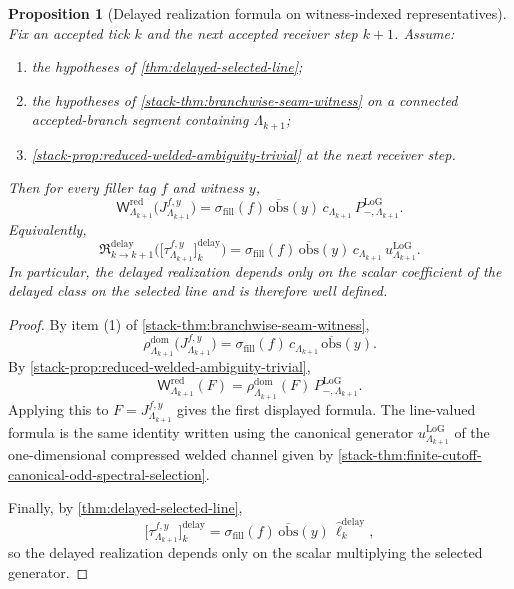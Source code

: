 \documentclass[11pt]{article}
\theoremstyle{definition}
\theoremstyle{plain}
\newtheorem{proposition}[definition]{Proposition}
\theoremstyle{remark}
\begin{document}
\begin{proposition}[Delayed realization formula on witness-indexed representatives]
\label{prop:delayed-realization-formula}
Fix an accepted tick \(k\) and the next accepted receiver step \(k+1\).
Assume:
\begin{enumerate}[leftmargin=2em,label=(\alph*)]
\item the hypotheses of \cref{thm:delayed-selected-line};
\item the hypotheses of \cref{stack-thm:branchwise-seam-witness} on a connected
  accepted-branch segment containing \(\Lambda_{k+1}\);
\item \cref{stack-prop:reduced-welded-ambiguity-trivial} at the next receiver step.
\end{enumerate}
Then for every filler tag \(f\) and witness \(y\),
\[
\mathsf W^{\mathrm{red}}_{\Lambda_{k+1}}\!\big(J^{f,y}_{\Lambda_{k+1}}\big)
=
\sigma_{\mathrm{fill}}(f)\,
\overline{\mathrm{obs}}(y)\,
c_{\Lambda_{k+1}}\,
P^{\mathrm{LoG}}_{-,\Lambda_{k+1}}.
\]
Equivalently,
\[
\mathfrak R^{\mathrm{delay}}_{k\to k+1}\!\big(
\big[\tau^{f,y}_{\Lambda_{k+1}}\big]^{\mathrm{delay}}_k
\big)
=
\sigma_{\mathrm{fill}}(f)\,
\overline{\mathrm{obs}}(y)\,
c_{\Lambda_{k+1}}\,
u^{\mathrm{LoG}}_{\Lambda_{k+1}}.
\]
In particular, the delayed realization depends only on the scalar coefficient of the delayed class
on the selected line and is therefore well defined.
\end{proposition}

\begin{proof}
By item \textnormal{(1)} of \cref{stack-thm:branchwise-seam-witness},
\[
\rho^{\mathrm{dom}}_{\Lambda_{k+1}}\!\big(J^{f,y}_{\Lambda_{k+1}}\big)
=
\sigma_{\mathrm{fill}}(f)\,
c_{\Lambda_{k+1}}\,
\overline{\mathrm{obs}}(y).
\]
By \cref{stack-prop:reduced-welded-ambiguity-trivial},
\[
\mathsf W^{\mathrm{red}}_{\Lambda_{k+1}}(F)
=
\rho^{\mathrm{dom}}_{\Lambda_{k+1}}(F)\,P^{\mathrm{LoG}}_{-,\Lambda_{k+1}}.
\]
Applying this to \(F=J^{f,y}_{\Lambda_{k+1}}\) gives the first displayed formula.
The line-valued formula is the same identity written using the canonical generator
\(
u^{\mathrm{LoG}}_{\Lambda_{k+1}}
\)
of the one-dimensional compressed welded channel given by
\cref{stack-thm:finite-cutoff-canonical-odd-spectral-selection}.

Finally, by \cref{thm:delayed-selected-line},
\[
\big[\tau^{f,y}_{\Lambda_{k+1}}\big]^{\mathrm{delay}}_k
=
\sigma_{\mathrm{fill}}(f)\,
\overline{\mathrm{obs}}(y)\,
\widehat\ell^{\mathrm{delay}}_k,
\]
so the delayed realization depends only on the scalar multiplying the selected generator.
\end{proof}
\end{document}
